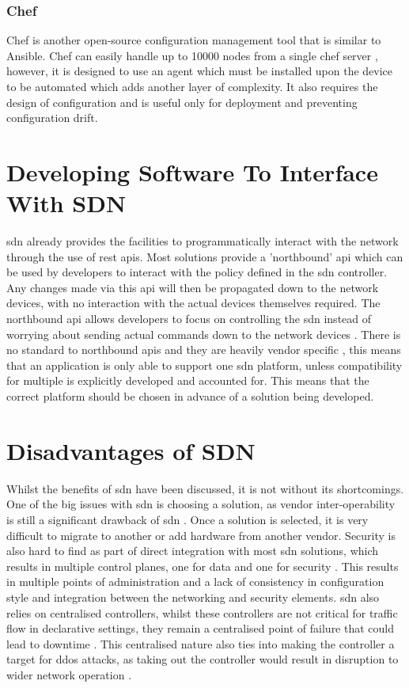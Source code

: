 \subsubsection{Chef}
Chef is another open-source configuration management tool
that is similar to Ansible. Chef can easily handle up to 10000 nodes from a
single chef server \citep{sabharwal2014automation}, however, it is designed to
use an agent which must be installed upon the device to be automated which adds
another layer of complexity. It also requires the design of configuration and
is useful only for deployment and preventing configuration drift.

\section{Developing Software To Interface With SDN}
\label{litreview:developing}
\gls{sdn} already provides the facilities to
programmatically interact with the network through the use of \gls{rest}
\gls{api}s. Most solutions provide a 'northbound' \gls{api} which can be used
by developers to interact with the policy defined in the \gls{sdn} controller.
Any changes made via this \gls{api} will then be propagated down to the network
devices, with no interaction with the actual devices themselves required. The
northbound \gls{api} allows developers to focus on controlling the \gls{sdn}
instead of worrying about sending actual commands down to the network devices
\citep{7899569}. There is no standard to northbound \gls{api}s and they are
heavily vendor specific \citep{7502469}, this means that an application is only
able to support one \gls{sdn} platform, unless compatibility for multiple is
explicitly developed and accounted for. This means that the correct platform
should be chosen in advance of a solution being developed.

\section{Disadvantages of SDN}
\label{litreview:disadvantages}
Whilst the benefits of \gls{sdn} have been discussed, it is not without its shortcomings. One of the big issues with \gls{sdn} is choosing a solution, as vendor inter-operability is still a significant drawback of \gls{sdn} \citep{5}. Once a solution is selected, it is very difficult to migrate to another or add hardware from another vendor. Security is also hard to find as part of direct integration with most \gls{sdn} solutions, which results in multiple control planes, one for data and one for security \citep{5}. This results in multiple points of administration and a lack of consistency in configuration style and integration between the networking and security elements. \gls{sdn} also relies on centralised controllers, whilst these controllers are not critical for traffic flow in declarative settings, they remain a centralised point of failure that could lead to downtime \citep{rana2019software}. This centralised nature also ties into making the controller a target for \gls{ddos} attacks, as taking out the controller would result in disruption to wider network operation \citep{7289347}.


